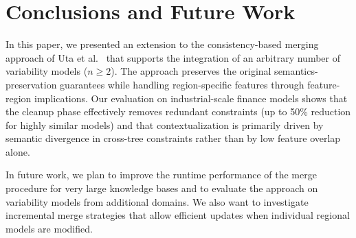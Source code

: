 \documentclass{ceurart}
\begin{document}
\section{Conclusions and Future Work}
In this paper, we presented an extension to the consistency-based merging approach of Uta et al.~\cite{Uta2019} that supports the integration of an arbitrary number of variability models ($n \ge 2$). The approach preserves the original semantics-preservation guarantees while handling region-specific features through feature-region implications. Our evaluation on industrial-scale finance models shows that the cleanup phase effectively removes redundant constraints (up to 50\% reduction for highly similar models) and that contextualization is primarily driven by semantic divergence in cross-tree constraints rather than by low feature overlap alone.

In future work, we plan to improve the runtime performance of the merge procedure for very large knowledge bases and to evaluate the approach on variability models from additional domains. We also want to investigate incremental merge strategies that allow efficient updates when individual regional models are modified.
\end{document}
